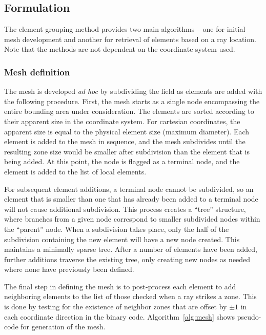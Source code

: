 \documentclass[11pt,letterpaper]{article}
\begin{document}
\subsection{Formulation}

The element grouping method provides two main algorithms -- one for initial mesh development and another for retrieval of elements based on a ray location. 
Note that the methods are not dependent on the coordinate system used. 

\subsubsection{Mesh definition}

The mesh is developed {\sl ad hoc} by subdividing the field as elements are added with the following procedure. 
First, the mesh starts as a single node encompassing the entire bounding area under consideration. 
The elements are sorted according to their apparent size in the coordinate system. For cartesian coordinates, the apparent size is equal to the physical element size (maximum diameter). 
Each element is added to the mesh in sequence, and the mesh subdivides until the resulting zone size would be smaller after subdivision than the element that is being added. 
At this point, the node is flagged as a terminal node, and the element is added to the list of local elements. 

For subsequent element additions, a terminal node cannot be subdivided, so an element that is smaller than one that has already been added to a terminal node will not cause additional subdivision. 
This process creates a ``tree'' structure, where branches from a given node correspond to smaller subdivided nodes within the ``parent'' node. 
When a subdivision takes place, only the half of the subdivision containing the new element will have a new node created. 
This maintains a minimally sparse tree. 
%
After a number of elements have been added, further additions traverse the existing tree, only creating new nodes as needed where none have previously been defined.

The final step in defining the mesh is to post-process each element to add neighboring elements to the list of those checked when a ray strikes a zone. 
This is done by testing for the existence of neighbor zones that are offset by $\pm 1$ in each coordinate direction in the binary code.
Algorithm~\ref{alg:mesh} shows pseudo-code for generation of the mesh. 
\end{document}
